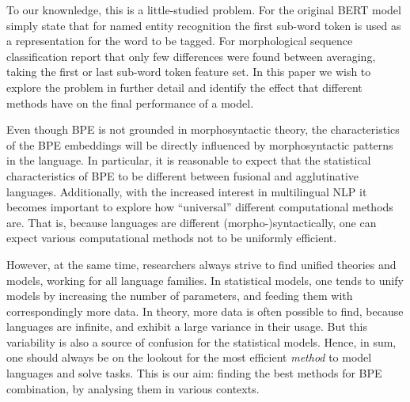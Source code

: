 \documentclass[11pt]{article}
\newcommand\citet{\newcite}
\begin{document}

                	To our knownledge, this is a little-studied
     problem. For the original BERT model \citet{devlin2018bert} simply
     state that for named entity recognition the first sub-word token
     is used as a representation for the word to be tagged.  For
     morphological sequence classification \citet{kondratyuk2019cross}
     report that only few differences were found between averaging,
     taking the first or last sub-word token feature set.  In this paper we wish
     to explore the problem in further detail and identify the effect
     that different methods have on the final performance of a model.

     Even though BPE is not grounded in morphosyntactic theory, the
     characteristics of the BPE embeddings will be directly influenced
     by morphosyntactic patterns in the language. In particular, it is
     reasonable to expect that the statistical characteristics of BPE
     to be different between fusional and agglutinative languages.
             Additionally, with the increased interest in multilingual
     NLP it becomes important to explore how ``universal'' different
     computational methods are.  That is, because languages are
     different (morpho-)syntactically, %
     one can expect various computational
     methods not to be uniformly efficient. %

     However, at the same time, researchers always strive
     to find unified theories and models, working for all language
     families.
     In statistical models, one tends to unify models by increasing
     the number of parameters, and feeding them with correspondingly
     more data.  In theory, more data is often possible to find,
     because languages are infinite, and exhibit a large variance in
     their usage. But this variability is also a source of confusion
     for the statistical models. Hence, in sum, one should always be
     on the lookout for the most efficient \emph{method} to model
     languages and solve tasks. This is our aim: finding the best
     methods for BPE combination, by analysing them in various
     contexts.
\end{document}

